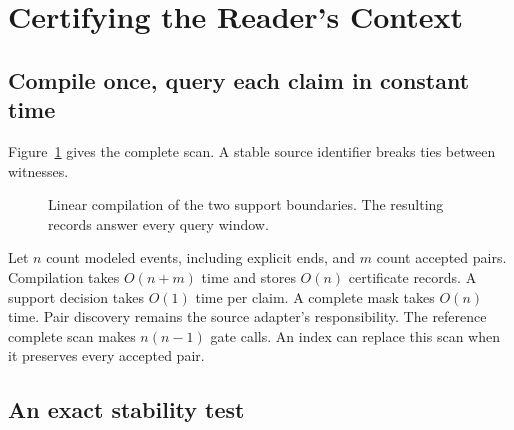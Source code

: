 \section{Certifying the Reader's Context}
\label{sec:method}

\subsection{Compile once, query each claim in constant time}

Figure~\ref{fig:compiler} gives the complete scan.
A stable source identifier breaks ties between witnesses.

\begin{figure}[t]
\centering
{}
\caption{Linear compilation of the two support boundaries. The resulting records answer every query window.}
\label{fig:compiler}
\end{figure}

Let $n$ count modeled events, including explicit ends, and $m$ count accepted pairs.
Compilation takes $O(n+m)$ time and stores $O(n)$ certificate records.
A support decision takes $O(1)$ time per claim.
A complete mask takes $O(n)$ time.
Pair discovery remains the source adapter's responsibility.
The reference complete scan makes $n(n-1)$ gate calls.
An index can replace this scan when it preserves every accepted pair.

\subsection{An exact stability test}

